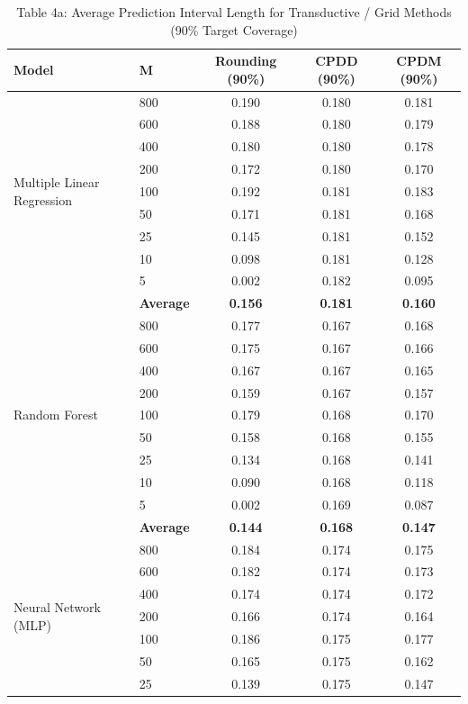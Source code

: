 \documentclass[11pt,a4paper]{article}
\begin{document}
\begin{table}[H]
\centering
\caption{Table 4a: Average Prediction Interval Length for Transductive / Grid Methods (90\% Target Coverage)}
\label{tab:mvp_tab4a}
\scriptsize
\begin{tabular}{llccc}
\toprule
Model & M & Rounding (90\%) & CPDD (90\%) & CPDM (90\%) \\
\midrule
\multirow{9}{*}{Multiple Linear Regression}
 & 800 & 0.190 & 0.180 & 0.181 \\
 & 600 & 0.188 & 0.180 & 0.179 \\
 & 400 & 0.180 & 0.180 & 0.178 \\
 & 200 & 0.172 & 0.180 & 0.170 \\
 & 100 & 0.192 & 0.181 & 0.183 \\
 & 50  & 0.171 & 0.181 & 0.168 \\
 & 25  & 0.145 & 0.181 & 0.152 \\
 & 10  & 0.098 & 0.181 & 0.128 \\
 & 5   & 0.002 & 0.182 & 0.095 \\
 & \textbf{Average} & \textbf{0.156} & \textbf{0.181} & \textbf{0.160} \\
\midrule
\multirow{9}{*}{Random Forest}
 & 800 & 0.177 & 0.167 & 0.168 \\
 & 600 & 0.175 & 0.167 & 0.166 \\
 & 400 & 0.167 & 0.167 & 0.165 \\
 & 200 & 0.159 & 0.167 & 0.157 \\
 & 100 & 0.179 & 0.168 & 0.170 \\
 & 50  & 0.158 & 0.168 & 0.155 \\
 & 25  & 0.134 & 0.168 & 0.141 \\
 & 10  & 0.090 & 0.168 & 0.118 \\
 & 5   & 0.002 & 0.169 & 0.087 \\
 & \textbf{Average} & \textbf{0.144} & \textbf{0.168} & \textbf{0.147} \\
\midrule
\multirow{9}{*}{Neural Network (MLP)}
 & 800 & 0.184 & 0.174 & 0.175 \\
 & 600 & 0.182 & 0.174 & 0.173 \\
 & 400 & 0.174 & 0.174 & 0.172 \\
 & 200 & 0.166 & 0.174 & 0.164 \\
 & 100 & 0.186 & 0.175 & 0.177 \\
 & 50  & 0.165 & 0.175 & 0.162 \\
 & 25  & 0.139 & 0.175 & 0.147 \\

\end{tabular}
\end{table}
\end{document}
